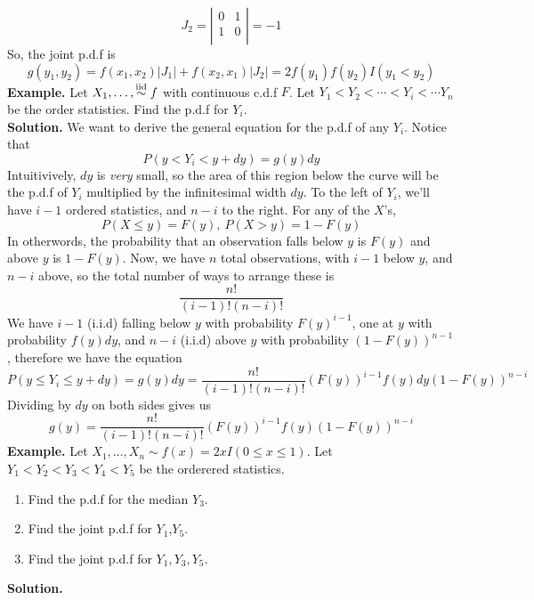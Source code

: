 \documentclass[openany]{report}
\begin{document}
     \[J_2 = \left|\begin{matrix}
        0 & 1 \\
        1 & 0\\
     \end{matrix}\right| = -1\]
     So, the joint p.d.f is 
     \[g(y_1,y_2) = f(x_1,x_2)|J_1| + f(x_2, x_1)|J_2| = 2f(y_1)f(y_2)I(y_1 < y_2)\]
     \textbf{Example.} Let $X_1, \ldots, \overset{\mathrm{iid}}{\sim} f$ with continuous c.d.f $F$. Let $Y_1 < Y_2 < \cdots < Y_i < \cdots Y_n$ be the order statistics. Find the p.d.f for  $Y_i$. \\[2ex]
     \textbf{Solution.} We want to derive the general equation for the p.d.f of any $Y_i$. Notice that 
     \[P(y < Y_i < y + dy) = g(y)dy\]
     Intuitivively, $dy$ is \emph{very} small, so the area of this region below the curve will be the p.d.f of $Y_i$ multiplied by the infinitesimal width $dy$. To the left of $Y_i$, we'll have $i - 1$ ordered statistics, and $n-i$ to the right. For any of the $X$'s, 
     \[P(X \leq y) = F(y), \ P(X > y) = 1 - F(y)\]
     In otherwords, the probability that an observation falls below $y$ is $F(y)$ and above $y$ is $1 - F(y)$. Now, we have $n$ total observations, with $i-1$ below $y$, and $n-i$ above, so the total number of ways to arrange these is 
     \[\frac{n!}{(i-1)!(n-i)!}\]
     We have $i-1$ (i.i.d) falling below $y$ with probability $F(y)^{i-1}$, one at $y$ with probability $f(y)dy$, and $n-i$ (i.i.d) above $y$ with probability $(1-F(y))^{n-1}$, therefore we have the equation 
     \[P(y \leq Y_i \leq y + dy) = g(y)dy = \frac{n!}{(i-1)!(n-i)!}(F(y))^{i-1}f(y)dy(1-F(y))^{n-i}\]
     Dividing by $dy$ on both sides gives us 
     \[g(y) = \frac{n!}{(i-1)!(n-i)!}(F(y))^{i-1}f(y)(1-F(y))^{n-i}\]
     \textbf{Example.} Let $X_1, \ldots, X_n \sim f(x) = 2xI(0 \leq x \leq 1)$. Let $Y_1 < Y_2 < Y_3 < Y_4 < Y_5$ be the orderered statistics. 
     \begin{enumerate}[label=(\roman*)]
        \item Find the p.d.f for the median $Y_3$. 
        \item Find the joint p.d.f for $Y_1$,$Y_5$.
        \item Find the joint p.d.f for $Y_1, Y_3, Y_5$. 
     \end{enumerate}
     \noindent
     \textbf{Solution.} 
\end{document}
